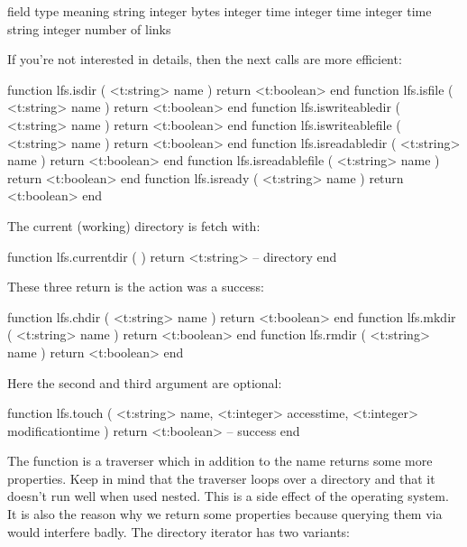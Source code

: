 \starttabulate[|T|||]
\FL
\BC field                \BC type    \BC meaning \NC \NR
\TL
\NC {}         \NC string  \NC {}    \NC \NR
\NC {}         \NC integer \NC bytes \NC \NR
\NC {} \NC integer \NC time \NC \NR
\NC {}       \NC integer \NC time \NC \NR
\NC {}       \NC integer \NC time \NC \NR
\NC {}  \NC string  \NC {} \NC \NR
\NC {}        \NC integer \NC number of links \NC \NR
\LL
\stoptabulate

If you're not interested in details, then the next calls are more efficient:

\starttyping[option=LUA]
function lfs.isdir           ( <t:string> name ) return <t:boolean> end
function lfs.isfile          ( <t:string> name ) return <t:boolean> end
function lfs.iswriteabledir  ( <t:string> name ) return <t:boolean> end
function lfs.iswriteablefile ( <t:string> name ) return <t:boolean> end
function lfs.isreadabledir   ( <t:string> name ) return <t:boolean> end
function lfs.isreadablefile  ( <t:string> name ) return <t:boolean> end
function lfs.isready         ( <t:string> name ) return <t:boolean> end
\stoptyping

The current (working) directory is fetch with:

\starttyping[option=LUA]
function lfs.currentdir ( )
    return <t:string> -- directory
end
\stoptyping

These three return  is the action was a success:

\starttyping[option=LUA]
function lfs.chdir ( <t:string> name ) return <t:boolean> end
function lfs.mkdir ( <t:string> name ) return <t:boolean> end
function lfs.rmdir ( <t:string> name ) return <t:boolean> end
\stoptyping

Here the second and third argument are optional:

\starttyping[option=LUA]
function lfs.touch (
    <t:string>  name,
    <t:integer> accesstime,
    <t:integer> modificationtime
)
    return <t:boolean> -- success
end
\stoptyping

The  function is a traverser which in addition to the name returns
some more properties. Keep in mind that the traverser loops over a directory and
that it doesn't run well when used nested. This is a side effect of the operating
system. It is also the reason why we return some properties because querying them
via  would interfere badly. The directory iterator has two
variants:

